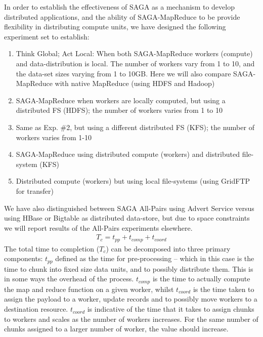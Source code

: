 \documentclass[conference,final]{IEEEtran}
\newcommand{\sagamapreduce }{SAGA-MapReduce }
\begin{document}



In order to establish the effectiveness of SAGA as a mechanism to
develop distributed applications, and the ability of \sagamapreduce to
be provide flexibility in distributing compute units, we have designed
the following experiment set to establish:
\begin{enumerate}
\item Think Global; Act Local: When both \sagamapreduce workers
  (compute) and data-distribution is local. The number of workers vary
  from 1 to 10, and the data-set sizes varying from 1 to 10GB. Here we
  will also compare \sagamapreduce with native MapReduce (using HDFS
  and Hadoop)
\item \sagamapreduce when workers are locally computed, but using a distributed FS (HDFS); the number of workers varies from 1 to 10
\item Same as Exp. \#2, but using a different distributed FS
  (KFS); the number of workers varies from 1-10
\item \sagamapreduce using distributed compute (workers) and distributed file-system (KFS)
\item Distributed compute (workers) but using local file-systems (using GridFTP for transfer)
\end{enumerate}

We have also distinguished between SAGA All-Pairs using Advert Service
versus using HBase or Bigtable as distributed data-store, but due to
space constraints we will report results of the All-Pairs experiments
elsewhere.
\begin{eqnarray}
T_c = t_{pp} + t_{comp} + t_{coord}
\end{eqnarray}
The total time to completion ($T_c$) can be decomposed into three
primary components: $t_{pp}$ defined as the time for pre-processing --
which in this case is the time to chunk into fixed size data units,
and to possibly distribute them. This is in some ways the overhead of
the process.  $t_{comp}$ is the time to actually compute the map and
reduce function on a given worker, whilst $t_{coord}$ is the time
taken to assign the payload to a worker, update records and to
possibly move workers to a destination resource. $t_{coord}$ is
indicative of the time that it takes to assign chunks to workers and
scales as the number of workers increases. For the same number of
chunks assigned to a larger number of worker, the value should
increase.
\end{document}
